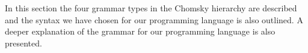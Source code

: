 In this section the four grammar types in the Chomsky hierarchy \citep{ItLatToC} are described and the syntax we have chosen for our programming language is also outlined. A deeper explanation of the grammar for our programming language is also presented.